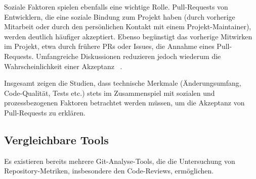 Soziale Faktoren spielen ebenfalls eine wichtige Rolle. Pull-Requests von Entwicklern, die eine soziale Bindung zum Projekt haben (durch vorherige Mitarbeit oder durch den persönlichen Kontakt mit einem Projekt-Maintainer), werden deutlich häufiger akzeptiert. Ebenso begünstigt das vorherige Mitwirken im Projekt, etwa durch frühere PRs oder Issues, die Annahme eines Pull-Requests. Umfangreiche Diskussionen reduzieren jedoch wiederum die Wahrscheinlichkeit einer Akzeptanz~ \parencite{tsay_influence_2014}.

Insgesamt zeigen die Studien, dass technische Merkmale (Änderungsumfang, Code-Qualität, Tests etc.) stets im Zusammenspiel mit sozialen und prozessbezogenen Faktoren betrachtet werden müssen, um die Akzeptanz von Pull-Requests zu erklären.

\subsection{Vergleichbare Tools}
Es existieren bereits mehrere Git-Analyse-Tools, die die Untersuchung von Reposi\-tory-Metriken, insbesondere den Code-Reviews, ermöglichen. 

